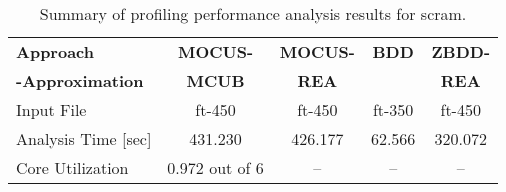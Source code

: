 \begin{table}[htbp]
    \centering
    \caption{Summary of profiling performance analysis results for scram.}
    \label{tab:scram_profiling}
    \begin{tabular}{|l|c|c|c|c|}
        \hline
        \textbf{Approach} & \textbf{MOCUS-} & \textbf{MOCUS-} & \textbf{BDD} & \textbf{ZBDD-} \\
        \textbf{-Approximation} & \textbf{MCUB} & \textbf{REA} & & \textbf{REA} \\
        \hline
        Input File & ft-450 & ft-450 & ft-350 & ft-450 \\
        Analysis Time [sec] & 431.230 & 426.177 & 62.566 & 320.072 \\
        Core Utilization & 0.972 out of 6 & -- & -- & -- \\
        \hline
    \end{tabular}
\end{table}
